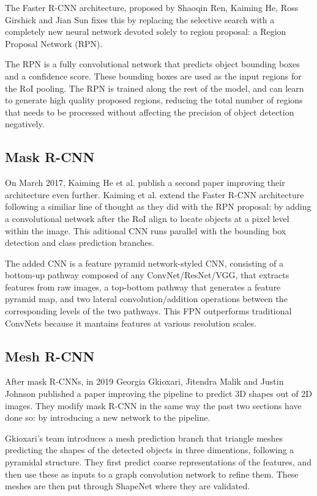 \documentclass[12pt,a4paper,twocolumn,twoside]{article}
\begin{document}
The Faster R-CNN architecture, proposed by Shaoqin Ren, Kaiming He, Ross Girshick and Jian Sun\cite{ren_he_girshick_sun_2015} fixes this by replacing the selective search with a completely new neural network devoted solely to region proposal: a Region Proposal Network (RPN). 

The RPN is a fully convolutional network that predicts object bounding boxes and a confidence score. These bounding boxes are used as the input regions for the RoI pooling. The RPN is trained along the rest of the model, and can learn to generate high quality proposed regions, reducing the total number of regions that needs to be processed without affecting the precision of object detection negatively. 

\subsection{Mask R-CNN}
On March 2017, Kaiming He et al.\cite{he_gkioxari_dollár_girshick_2017} publish a second paper improving their architecture even further. Kaiming et al. extend the Faster R-CNN architecture following a similiar line of thought as they did with the RPN proposal: by adding a convolutional network after the RoI align to locate objects at a pixel level within the image. This aditional CNN runs parallel with the bounding box detection and class prediction branches. 

The added CNN is a feature pyramid network-styled CNN, consisting of a bottom-up pathway composed of any ConvNet/ResNet/VGG, that extracts features from raw images, a top-bottom pathway that generates a feature pyramid map, and two lateral convolution/addition operations between the corresponding levels of the two pathways. This FPN outperforms traditional ConvNets because it mantains features at various resolution scales. 

\subsection{Mesh R-CNN}
After mask R-CNNs, in 2019 Georgia Gkioxari, Jitendra Malik and Justin Johnson\cite{gkioxari_malik_johnson_2019} published a paper improving the pipeline to predict 3D shapes out of 2D images. They modify mask R-CNN in the same way the past two sections have done so: by introducing a new network to the pipeline. 

Gkioxari's team introduces a mesh prediction branch that triangle meshes predicting the shapes of the detected objects in three dimentions, following a pyramidal structure. They first predict coarse representations of the features, and then use these as inputs to a graph convolution network to refine them. These meshes are then put through ShapeNet where they are validated.
\end{document}
